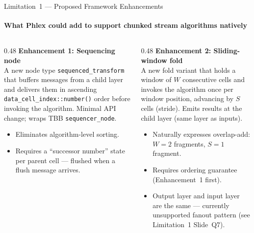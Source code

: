 \documentclass[aspectratio=169,10pt]{beamer}
\newcommand{\code}[1]{\texttt{\small #1}}
\begin{document}

\begin{frame}{Limitation~1 --- Proposed Framework Enhancements}
  \framesubtitle{What Phlex could add to support chunked stream algorithms natively}

  \begin{columns}[T]
    \begin{column}{0.48\textwidth}
      \textbf{Enhancement 1: Sequencing node} \\[2pt]
      \small
      A new node type \code{sequenced\_transform} that buffers messages
      from a child layer and delivers them in ascending
      \code{data\_cell\_index::number()} order before invoking the
      algorithm.  Minimal API change; wraps TBB
      \code{sequencer\_node}.
      \begin{itemize}\tiny
        \item Eliminates algorithm-level sorting.
        \item Requires a ``successor number'' state per parent cell ---
              flushed when a flush message arrives.
      \end{itemize}
    \end{column}
    \begin{column}{0.48\textwidth}
      \textbf{Enhancement 2: Sliding-window fold} \\[2pt]
      \small
      A new fold variant that holds a window of $W$ consecutive cells
      and invokes the algorithm once per window position, advancing by
      $S$ cells (stride).  Emits results at the child layer (same layer
      as inputs).
      \begin{itemize}\tiny
        \item Naturally expresses overlap-add: $W=2$ fragments,
              $S=1$ fragment.
        \item Requires ordering guarantee (Enhancement~1 first).
        \item Output layer and input layer are the same --- currently
              unsupported fanout pattern (see Limitation~1 Slide~Q7).
      \end{itemize}
    \end{column}
  \end{columns}


\end{frame}
\end{document}
